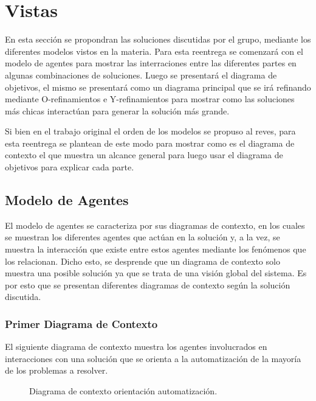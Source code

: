 \documentclass[a4paper,10pt]{article}
\begin{document}
\section*{Vistas}

En esta secci\'on se propondran las soluciones discutidas por el grupo, mediante los diferentes modelos vistos en la materia.
Para esta reentrega se comenzar\'a con el modelo de agentes para mostrar las interraciones entre las diferentes partes en algunas combinaciones de soluciones. Luego se presentar\'a el diagrama de objetivos, el mismo se presentar\'a como un diagrama principal que se ir\'a refinando mediante O-refinamientos e Y-refinamientos para mostrar como las soluciones m\'as chicas interact\'uan para generar la soluci\'on m\'as grande.

Si bien en el trabajo original el orden de los modelos se propuso al reves, para esta reentrega se plantean de este modo para mostrar como es el diagrama de contexto el que muestra un alcance general para luego usar el diagrama de objetivos para explicar cada parte.

\subsection*{Modelo de Agentes}

El modelo de agentes se caracteriza por sus diagramas de contexto, en los cuales se muestran los diferentes agentes que act\'uan en la soluci\'on y,
a la vez, se muestra la interacci\'on que existe entre estos agentes mediante los fen\'omenos que los relacionan. Dicho esto, se desprende que un
diagrama de contexto solo muestra una posible soluci\'on ya que se trata de una visi\'on global del sistema. Es por esto que se presentan diferentes
diagramas de contexto seg\'un la soluci\'on discutida.

\subsubsection*{Primer Diagrama de Contexto}
El siguiente diagrama de contexto muestra los agentes involucrados en interacciones con una solución que se orienta a la automatización de la 
mayor\'ia de los problemas a resolver.

\begin{figure}[H]
\centering
{}
\caption{Diagrama de contexto orientación automatización.}
\end{figure}
\end{document}
